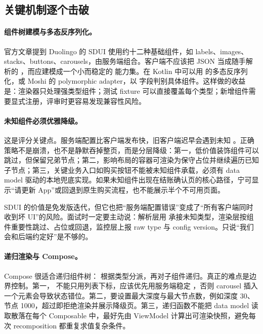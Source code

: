 \subsection{关键机制逐个击破}

\paragraph{组件树建模与多态反序列化。} \srcofficial 官方文章提到 Duolingo 的 SDUI 使用约十二种基础组件，如 labels、images、stacks、buttons、carousels，由服务端组合。客户端不应该把 JSON 当成随手解析的 ，而应建模成一个小而稳定的  能力集。\srcinferred 在 Kotlin 中可以用  的多态反序列化，或 Moshi 的 polymorphic adapter，以  字段判别具体组件。这样做的收益是：渲染器只处理强类型组件；测试 fixture 可以直接覆盖每个类型；新增组件需要显式注册，评审时更容易发现兼容性风险。

\paragraph{未知组件必须优雅降级。} 这是评分关键点。服务端配置比客户端发布快，旧客户端迟早会遇到未知 。正确策略不是崩溃，也不是静默吞掉整页，而是分层降级：第一，低价值装饰组件可以跳过，但保留兄弟节点；第二，影响布局的容器可渲染为保守占位并继续遍历已知子节点；第三，关键业务入口如购买按钮不能被未知组件承载，必须有 data model 驱动的本地兜底实现。\srcinferred 如果未知组件出现在结账确认页的核心路径，宁可显示“请更新 App”或回退到原生购买流程，也不能展示半个不可用页面。

\begin{pitfall}[未知组件导致整页崩溃]
SDUI 的价值是免发版迭代，但它也把“服务端配置错误”变成了“所有客户端同时收到坏 UI”的风险。面试时一定要主动说：解析层用  承接未知类型，渲染层按组件重要性跳过、占位或回退，监控层上报 raw type 与 config version。只说“我们会和后端约定好”是不够的。
\end{pitfall}

\paragraph{递归渲染与 Compose。} \srcinferred Compose 很适合递归组件树： 根据类型分派，再对子组件递归。真正的难点是边界控制。第一， 不能只用列表下标，应该优先用服务端稳定 ，否则 carousel 插入一个元素会导致状态错位。第二，要设置最大深度与最大节点数，例如深度 30、节点 1000，超过即拒绝渲染并展示降级页。第三，递归函数不能把 data model 读取散落在每个 Composable 中，最好先由 ViewModel 计算出可渲染快照，避免每次 recomposition 都重复求值复杂条件。

